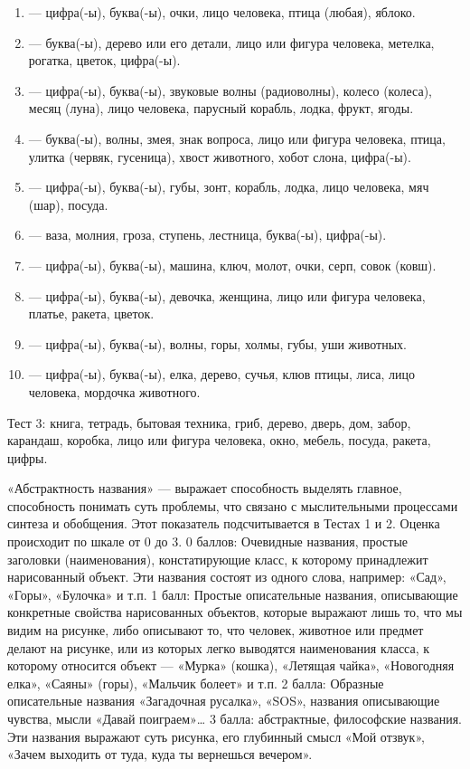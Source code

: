 \begin{landscape}
\begin{multicols}{3}
{\begin{enumerate}[noitemsep,topsep=0pt,parsep=0pt,partopsep=0pt]
    \item — цифра(-ы), буква(-ы), очки, лицо человека, птица (любая), яблоко.
    \item — буква(-ы), дерево или его детали, лицо или фигура человека, метелка, рогатка, цветок, цифра(-ы).
    \item — цифра(-ы), буква(-ы), звуковые волны (радиоволны), колесо (колеса), месяц (луна), лицо человека, парусный корабль, лодка, фрукт, ягоды.
    \item — буква(-ы), волны, змея, знак вопроса, лицо или фигура человека, птица, улитка (червяк, гусеница), хвост животного, хобот слона, цифра(-ы).
    \item — цифра(-ы), буква(-ы), губы, зонт, корабль, лодка, лицо человека, мяч (шар), посуда.
    \item — ваза, молния, гроза, ступень, лестница, буква(-ы), цифра(-ы).
    \item — цифра(-ы), буква(-ы), машина, ключ, молот, очки, серп, совок (ковш).
    \item — цифра(-ы), буква(-ы), девочка, женщина, лицо или фигура человека, платье, ракета, цветок.
    \item — цифра(-ы), буква(-ы), волны, горы, холмы, губы, уши животных.
    \item  — цифра(-ы), буква(-ы), елка, дерево, сучья, клюв птицы, лиса, лицо человека, мордочка животного.
\end{enumerate}

Тест 3: книга, тетрадь, бытовая техника, гриб, дерево, дверь, дом, забор, карандаш, коробка, лицо или фигура человека, окно, мебель, посуда, ракета, цифры.

«Абстрактность названия» — выражает способность выделять главное, 
способность понимать суть проблемы, что связано с мыслительными 
процессами синтеза и обобщения. Этот показатель подсчитывается в 
Тестах 1 и 2. Оценка происходит по шкале от 0 до 3.
0 баллов: Очевидные названия, простые заголовки (наименования), 
констатирующие класс, к которому принадлежит нарисованный объект. 
Эти названия состоят из одного слова, например: «Сад», «Горы», 
«Булочка» и т.п.
1 балл: Простые описательные названия, описывающие конкретные свойства 
нарисованных объектов, которые выражают лишь то, что мы видим на рисунке, 
либо описывают то, что человек, животное или предмет делают на рисунке, 
или из которых легко выводятся наименования класса, к которому относится 
объект — «Мурка» (кошка), «Летящая чайка», «Новогодняя елка», «Саяны» (горы), 
«Мальчик болеет» и т.п.
2 балла: Образные описательные названия «Загадочная русалка», 
«SOS», названия описывающие чувства, мысли «Давай поиграем»…
3 балла: абстрактные, философские названия. Эти названия выражают суть рисунка, 
его глубинный смысл «Мой отзвук», «Зачем выходить от туда, куда ты вернешься вечером».

}
\end{multicols}
\end{landscape}
